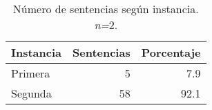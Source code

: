 \begin{table}[H]
\centering
\caption{Número de sentencias según instancia. \textit{n=}2.} 
\label{tab:instancia}
\begin{tabular}{lrr}
  \hline
Instancia & Sentencias & Porcentaje \\ 
  \hline
Primera &  5 & 7.9 \\ 
  Segunda & 58 & 92.1 \\ 
   \hline
\end{tabular}
\end{table}

